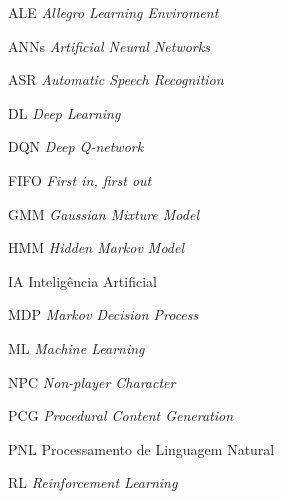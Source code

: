 \begin{siglas}
 \item[ALE] \textit{Allegro Learning Enviroment}
 \item[ANNs] \textit{Artificial Neural Networks}
 \item[ASR] \textit{Automatic Speech Recognition}
 \item[DL] \textit{Deep Learning}
 \item[DQN] \textit{Deep Q-network}
 \item[FIFO] \textit{First in, first out}
 \item[GMM] \textit{Gaussian Mixture Model}
 \item[HMM] \textit{Hidden Markov Model}
 \item[IA] Inteligência Artificial
 \item[MDP] \textit{Markov Decision Process}
 \item[ML] \textit{Machine Learning}
 \item[NPC] \textit{Non-player Character}
 \item[PCG] \textit{Procedural Content Generation}
 \item[PNL] Processamento de Linguagem Natural
 \item[RL] \textit{Reinforcement Learning}
\end{siglas}

